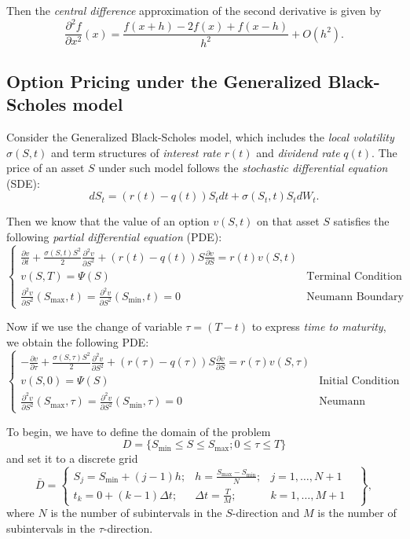 Then the \textit{central difference} approximation of the second derivative is given by
\begin{equation}\label{cf2}
\frac{\partial^2 f}{\partial x^2}(x) = \frac{f(x+h)-2f(x)+f(x-h)}{h^2}+O(h^2).
\end{equation}

\subsection*{Option Pricing under the Generalized Black-Scholes model}
\label{sec:FD:GBS_PDE}
Consider the Generalized Black-Scholes model, which includes the \textit{local volatility} $\sigma(S,t)$ and term structures of \textit{interest rate} $r(t)$ and \textit{dividend rate} $q(t)$. The price of an asset $S$ under such model follows the \textit{stochastic differential equation} (SDE):
$$dS_t = (r(t)-q(t))S_t dt + \sigma(S_t,t)S_tdW_t.$$

Then we know that the value of an option $v(S,t)$ on that asset $S$ satisfies the following \textit{partial differential equation} (PDE):
$$\begin{cases}
\frac{\partial v}{\partial t} + \frac{\sigma(S,t)S^2}{2}\frac{\partial^2 v}{\partial S^2}+(r(t)-q(t))S\frac{\partial v}{\partial S}= r(t)v(S,t)\\
v(S,T) = \Psi(S) & \text{Terminal Condition (Payoff function)}\\
\frac{\partial^2 v}{\partial S^2}(S_{\max},t)=\frac{\partial^2 v}{\partial S^2}(S_{\min},t)=0 &\text{Neumann Boundary Conditions}
\end{cases}$$

Now if we use the change of variable $\tau = (T-t)$ to express \textit{time to maturity}, we obtain the following PDE:
$$\begin{cases}
-\frac{\partial v}{\partial \tau} + \frac{\sigma(S,\tau)S^2}{2}\frac{\partial^2 v}{\partial S^2}+(r(\tau)-q(\tau))S\frac{\partial v}{\partial S}= r(\tau)v(S,\tau)\\
v(S,0) = \Psi(S) & \text{Initial Condition (Payoff function)}\\
\frac{\partial^2 v}{\partial S^2}(S_{\max},\tau)=\frac{\partial^2 v}{\partial S^2}(S_{\min},\tau)=0 &\text{Neumann Boundary Conditions}
\end{cases}$$

To begin, we have to define the domain of the problem $$D = \{S_{\min}\leq S\leq S_{\max} ; 0 \leq \tau \leq T\}$$
and set it to a discrete grid
$$\bar{D} = \begin{Bmatrix}
S_j = S_{\min}+(j-1)h; & h=\frac{S_{\max}-S_{\min}}{N}; & j = 1,\ldots,N+1 \\ t_k = 0 + (k-1)\Delta t; & \Delta t = \frac{T}{M}; &k = 1,\ldots,M+1 &
\end{Bmatrix},$$
where $N$ is the number of subintervals in the $S$-direction and $M$ is the number of subintervals in the $\tau$-direction.

